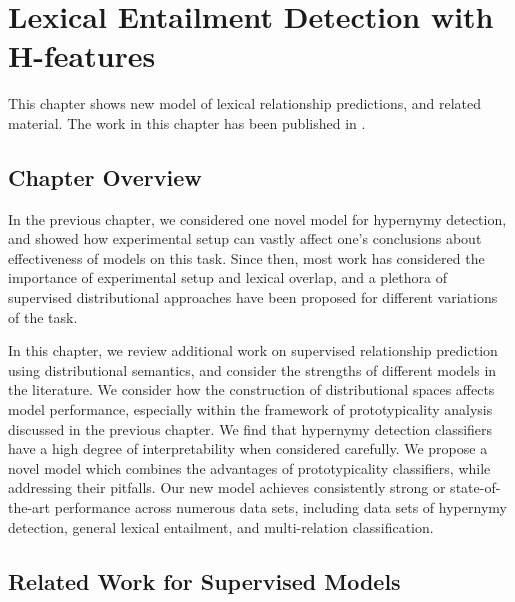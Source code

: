 \chapter{Lexical Entailment Detection with H-features}
\label{ch:hpm}

This chapter shows new model of lexical relationship predictions, and related
material. The work in this chapter has been published in
.

\section{Chapter Overview}

In the previous chapter, we considered one novel model for hypernymy detection,
and showed how experimental setup can vastly affect one's conclusions about
effectiveness of models on this task. Since then, most work has considered the
importance of experimental setup and lexical overlap, and a plethora of
supervised distributional approaches have been proposed for different variations
of the task.

In this chapter, we review additional work on supervised relationship
prediction using distributional semantics, and consider the strengths of
different models in the literature. We consider how the construction of
distributional spaces affects model performance, especially within the
framework of prototypicality analysis discussed in the previous chapter. We
find that hypernymy detection classifiers have a high degree of
interpretability when considered carefully.  We propose a novel model which
combines the advantages of prototypicality classifiers, while addressing their
pitfalls. Our new model achieves consistently strong or state-of-the-art
performance across numerous data sets, including data sets of hypernymy
detection, general lexical entailment, and multi-relation classification.

\section{Related Work for Supervised Models}

